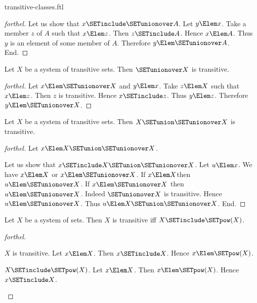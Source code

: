 \documentclass{stex}
\begin{document}
\begin{smodule}{transitive-classes.ftl}
\begin{proof}[forthel]
  Let us show that $x \SETinclude \SETunionover A$.
    Let $y \Elem x$.
    Take a member $z$ of $A$ such that $x \Elem z$.
    Then $z \SETinclude A$.
    Hence $x \Elem A$.
    Thus $y$ is an element of some member of $A$.
    Therefore $y \Elem \SETunionover A$.
  End.
\end{proof}

\begin{proposition}[forthel,id=SET_THEORY_01_6726468811882496]
  Let $X$ be a system of transitive sets.
  Then $\SETunionover X$ is transitive.
\end{proposition}
\begin{proof}[forthel]
  Let $x \Elem \SETunionover X$ and $y \Elem x$.
  Take $z \Elem X$ such that $x \Elem z$.
  Then $z$ is transitive.
  Hence $x \SETinclude z$.
  Thus $y \Elem z$.
  Therefore $y \Elem \SETunionover X$.
\end{proof}

\begin{proposition}[forthel,id=SET_THEORY_01_4884401668227072]
  Let $X$ be a system of transitive sets.
  Then $X \SETunion \SETunionover X$ is transitive.
\end{proposition}
\begin{proof}[forthel]
  Let $x \Elem X \SETunion \SETunionover X$.

  Let us show that $x \SETinclude X \SETunion \SETunionover X$.
    Let $u \Elem x$.
    We have $x \Elem X$ or $x \Elem \SETunionover X$.
    If $x \Elem X$then $u \Elem \SETunionover X$.
    If $x \Elem \SETunionover X$ then $u \Elem \SETunionover X$.
    Indeed $\SETunionover X$ is transitive.
    Hence $u \Elem \SETunionover X$.
    Thus $u \Elem X \SETunion \SETunionover X$.
  End.
\end{proof}

\begin{proposition}[forthel,id=SET_THEORY_01_1399002962591744]
  Let $X$ be a system of sets.
  Then $X$ is transitive iff $X \SETinclude \SETpow(X)$.
\end{proposition}
\begin{proof}[forthel]
  \begin{case}{$X$ is transitive.}
    Let $x \Elem X$.
    Then $x \SETinclude X$.
    Hence $x \Elem \SETpow(X)$.
  \end{case}

  \begin{case}{$X \SETinclude \SETpow(X)$.}
    Let $x \Elem X$.
    Then $x \Elem \SETpow(X)$.
    Hence $x \SETinclude X$.
  \end{case}
\end{proof}


\end{smodule}
\end{document}
